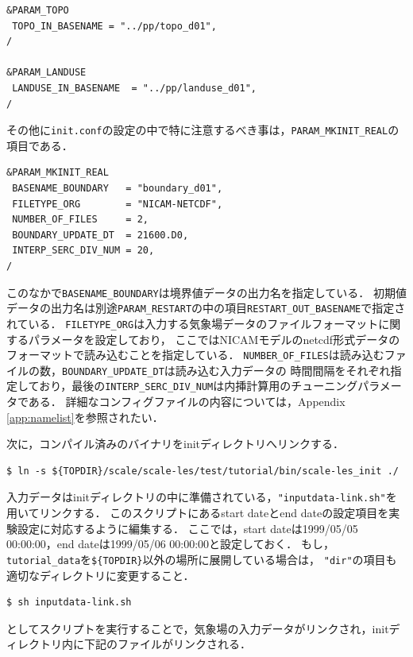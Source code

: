 \begin{verbatim}
&PARAM_TOPO
 TOPO_IN_BASENAME = "../pp/topo_d01",
/

&PARAM_LANDUSE
 LANDUSE_IN_BASENAME  = "../pp/landuse_d01",
/
\end{verbatim}


その他に\verb|init.conf|の設定の中で特に注意するべき事は，\verb|PARAM_MKINIT_REAL|の項目である．

\begin{verbatim}
&PARAM_MKINIT_REAL
 BASENAME_BOUNDARY   = "boundary_d01",
 FILETYPE_ORG        = "NICAM-NETCDF",
 NUMBER_OF_FILES     = 2,
 BOUNDARY_UPDATE_DT  = 21600.D0,
 INTERP_SERC_DIV_NUM = 20,
/
\end{verbatim}

このなかで\verb|BASENAME_BOUNDARY|は境界値データの出力名を指定している．
初期値データの出力名は別途\verb|PARAM_RESTART|の中の項目\verb|RESTART_OUT_BASENAME|で指定されている．
\verb|FILETYPE_ORG|は入力する気象場データのファイルフォーマットに関するパラメータを設定しており，
ここではNICAMモデルのnetcdf形式データのフォーマットで読み込むことを指定している．
\verb|NUMBER_OF_FILES|は読み込むファイルの数，\verb|BOUNDARY_UPDATE_DT|は読み込む入力データの
時間間隔をそれぞれ指定しており，最後の\verb|INTERP_SERC_DIV_NUM|は内挿計算用のチューニングパラメータである．
詳細なコンフィグファイルの内容については，Appendix \ref{app:namelist}を参照されたい．


次に，コンパイル済みのバイナリをinitディレクトリへリンクする．

\begin{verbatim}
$ ln -s ${TOPDIR}/scale/scale-les/test/tutorial/bin/scale-les_init ./
\end{verbatim}

入力データはinitディレクトリの中に準備されている，\verb|"inputdata-link.sh"|を用いてリンクする．
このスクリプトにあるstart dateとend dateの設定項目を実験設定に対応するように編集する．
ここでは，start dateは1999/05/05 00:00:00，end dateは1999/05/06 00:00:00と設定しておく．
もし，\verb|tutorial_data|を\verb|${TOPDIR}|以外の場所に展開している場合は，
\verb|"dir"|の項目も適切なディレクトリに変更すること．

\begin{verbatim}
$ sh inputdata-link.sh
\end{verbatim}
としてスクリプトを実行することで，気象場の入力データがリンクされ，initディレクトリ内に下記のファイルがリンクされる．

